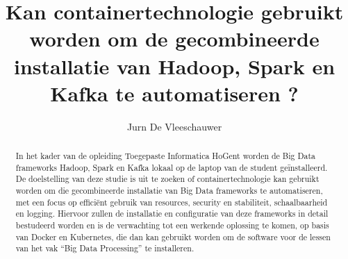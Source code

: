 \documentclass{hogent-article}
\title{Kan containertechnologie gebruikt worden om de gecombineerde installatie van Hadoop, Spark en Kafka te automatiseren ?}
\author{Jurn De Vleeschauwer}
\begin{document}
\begin{abstract}
In het kader van de opleiding Toegepaste Informatica HoGent worden de Big Data frameworks Hadoop, Spark en Kafka lokaal op de laptop van de student geïnstalleerd.
De doelstelling van deze studie is uit te zoeken of containertechnologie kan gebruikt worden om die gecombineerde installatie van Big Data frameworks te automatiseren, met een focus op efficiënt gebruik van resources, security en stabiliteit, schaalbaarheid en logging. Hiervoor zullen de installatie en configuratie van deze frameworks in detail bestudeerd worden en is de verwachting tot een werkende oplossing te komen, op basis van Docker en Kubernetes, die dan kan gebruikt worden om de software voor de lessen van het vak ``Big Data Processing'' te installeren.
\end{abstract}

\tableofcontents



\printbibliography[heading=bibintoc]
\end{document}
